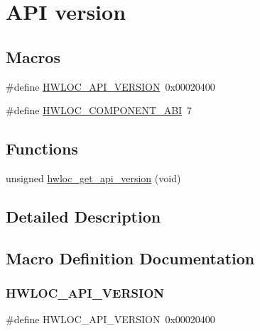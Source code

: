 \hypertarget{a00182}{}\section{A\+PI version}
\label{a00182}
\subsection*{Macros}
\begin{DoxyCompactItemize}
\item 
\#define \hyperlink{a00182_ga8f4dfb8eef138af55dd1a0fa802e5476}{H\+W\+L\+O\+C\+\_\+\+A\+P\+I\+\_\+\+V\+E\+R\+S\+I\+ON}~0x00020400
\item 
\#define \hyperlink{a00182_gaac5bc1f46f55e10ef0141a68ce70e21f}{H\+W\+L\+O\+C\+\_\+\+C\+O\+M\+P\+O\+N\+E\+N\+T\+\_\+\+A\+BI}~7
\end{DoxyCompactItemize}
\subsection*{Functions}
\begin{DoxyCompactItemize}
\item 
unsigned \hyperlink{a00182_ga9c0b50c98add1adf57ed1ce85bb5190d}{hwloc\+\_\+get\+\_\+api\+\_\+version} (void)
\end{DoxyCompactItemize}


\subsection{Detailed Description}


\subsection{Macro Definition Documentation}
\mbox{\label{a00182_ga8f4dfb8eef138af55dd1a0fa802e5476}} 
\subsubsection{\texorpdfstring{H\+W\+L\+O\+C\+\_\+\+A\+P\+I\+\_\+\+V\+E\+R\+S\+I\+ON}{HWLOC\_API\_VERSION}}
{\footnotesize\ttfamily \#define H\+W\+L\+O\+C\+\_\+\+A\+P\+I\+\_\+\+V\+E\+R\+S\+I\+ON~0x00020400}




